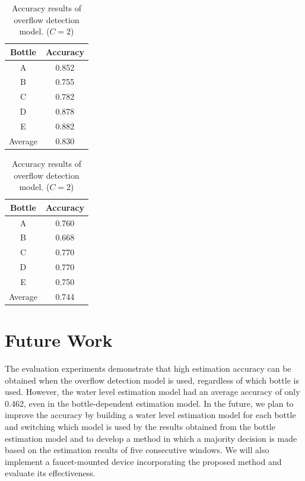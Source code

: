 \documentclass[sigconf,authordraft]{acmart}
\begin{document}
\begin{table}[!t]
  \centering
  \caption{Accuracy results of overflow detection model. ($C=2$)}
  \begin{minipage}[t]{0.45\linewidth}
    \centering
    \begin{tabular}{c|c} \hline\hline
    Bottle & Accuracy \\ \hline
    A & 0.852 \\
    B & 0.755 \\
    C & 0.782 \\
    D & 0.878 \\
    E & 0.882 \\ \hline
    Average & 0.830 \\ \hline
    \end{tabular}
    \label{tab:result_2_dependent}
  \end{minipage}
  \begin{minipage}[t]{0.45\linewidth}
    \centering
    \begin{tabular}{c|c} \hline\hline
    Bottle & Accuracy \\ \hline
    A & 0.760 \\
    B & 0.668 \\
    C & 0.770 \\
    D & 0.770 \\
    E & 0.750 \\ \hline
    Average & 0.744 \\ \hline
    \end{tabular}
    \label{tab:result_2_independent}
  \end{minipage}
  \label{tab:result_2}
\end{table}



\section{Future Work}
\label{sec:future_work}
The evaluation experiments demonstrate that high estimation accuracy can be obtained when the overflow detection model is used, regardless of which bottle is used. However, the water level estimation model had an average accuracy of only 0.462, even in the bottle-dependent estimation model. In the future, we plan to improve the accuracy by building a water level estimation model for each bottle and switching which model is used by the results obtained from the bottle estimation model and to develop a method in which a majority decision is made based on the estimation results of five consecutive windows. We will also implement a faucet-mounted device incorporating the proposed method and evaluate its effectiveness.
\end{document}
